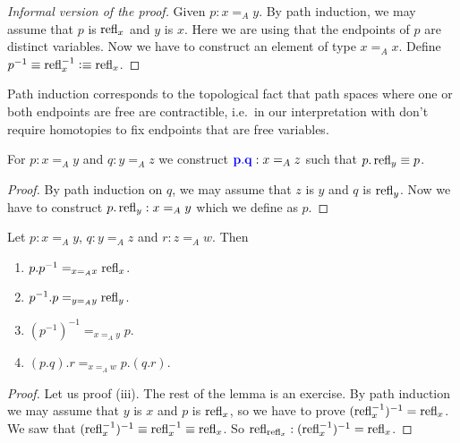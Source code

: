 \begin{proof}[Informal version of the proof]
    Given $p : x \mathrel{=_A} y$. 
    By path induction, we may assume that $p$ is $\operatorname{refl}_{x}$ and $y$ is $x$. 
    Here we are using that the endpoints of $p$ are distinct variables. 
    Now we have to construct an element of type $x \mathrel{=_A} x$. 
    Define $p^{-1} \equiv \operatorname{refl}_{x}^{-1} \vcentcolon\equiv \operatorname{refl}_{x}$. 
\end{proof}

\begin{rem}
    Path induction corresponds to the topological fact that path spaces where one or both endpoints are free are contractible, i.e.\ in our interpretation with don't require homotopies to fix endpoints that are free variables.
\end{rem}

\begin{boxlem}
    For $p : x \mathrel{=_A} y$ and $q : y \mathrel{=_A} z$ we construct $\alert{p.q} : x \mathrel{=_A} z$ such that $p.\operatorname{refl}_{y} \equiv p$.
\end{boxlem}

\begin{proof}
    By path induction on $q$, we may assume that $z$ is $y$ and $q$ is $\operatorname{refl}_{y}$. 
    Now we have to construct $p.\operatorname{refl}_{y} : x \mathrel{=_A} y$ which we define as $p$. 
\end{proof}

\begin{boxlem}\label{lem:paths}
    Let $p : x \mathrel{=_A} y$, $q : y \mathrel{=_A} z$ and $r : z \mathrel{=_A} w$. 
    Then
    \begin{enumerate}
        \item $p.p^{-1} \mathrel{=_{x \mathrel{=_A} x}} \operatorname{refl}_{x}$.
        \item $p^{-1}.p \mathrel{=_{y \mathrel{=_A} y}} \operatorname{refl}_{y}$.
        \item $(p^{-1})^{-1} \mathrel{=_{x \mathrel{=_A} y}} p$.
        \item $(p.q).r \mathrel{=_{x \mathrel{=_A} w}} p.(q.r)$.
    \end{enumerate}
\end{boxlem}

\begin{proof}
    Let us proof (iii). 
    The rest of the lemma is an exercise. 
    By path induction we may assume that $y$ is $x$ and $p$ is $\operatorname{refl}_{x}$, so we have to prove $(\operatorname{refl}_{x}^{-1})^{-1} = \operatorname{refl}_{x}$. 
    We saw that $(\operatorname{refl}_{x}^{-1})^{-1} \equiv \operatorname{refl}_{x}^{-1} \equiv \operatorname{refl}_{x}$.
    So $\operatorname{refl}_{\operatorname{refl}_{x}} : (\operatorname{refl}_{x}^{-1})^{-1} = \operatorname{refl}_{x}$.
\end{proof}

